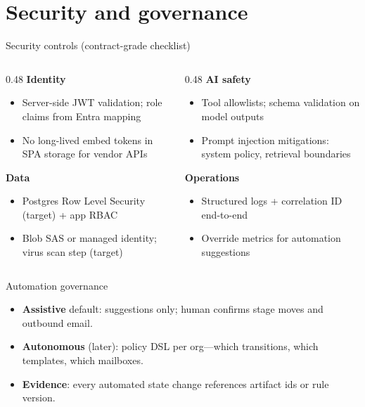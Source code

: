 \documentclass[aspectratio=169,11pt]{beamer}
\begin{document}
\section{Security and governance}

\begin{frame}{Security controls (contract-grade checklist)}
  \small
  \begin{columns}[T]
    \begin{column}{0.48\textwidth}
      \textbf{Identity}
      \begin{itemize}\itemsep2pt
        \item Server-side JWT validation; role claims from Entra mapping
        \item No long-lived embed tokens in SPA storage for vendor APIs
      \end{itemize}
      \textbf{Data}
      \begin{itemize}\itemsep2pt
        \item Postgres Row Level Security (target) + app RBAC
        \item Blob SAS or managed identity; virus scan step (target)
      \end{itemize}
    \end{column}
    \begin{column}{0.48\textwidth}
      \textbf{AI safety}
      \begin{itemize}\itemsep2pt
        \item Tool allowlists; schema validation on model outputs
        \item Prompt injection mitigations: system policy, retrieval boundaries
      \end{itemize}
      \textbf{Operations}
      \begin{itemize}\itemsep2pt
        \item Structured logs + correlation ID end-to-end
        \item Override metrics for automation suggestions
      \end{itemize}
    \end{column}
  \end{columns}
\end{frame}

\begin{frame}{Automation governance}
  \small
  \begin{itemize}
    \item \textbf{Assistive} default: suggestions only; human confirms stage moves and outbound email.
    \item \textbf{Autonomous} (later): policy DSL per org---which transitions, which templates, which mailboxes.
    \item \textbf{Evidence}: every automated state change references artifact ids or rule version.
  \end{itemize}
\end{frame}
\end{document}
